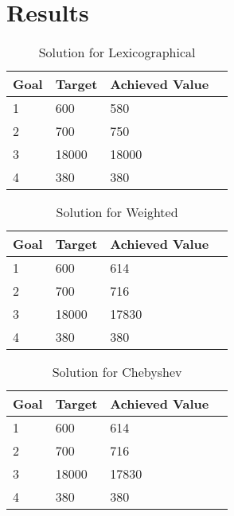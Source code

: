 \documentclass[twoside,twocolumn]{article}
\begin{document}

\section{Results}

\begin{table}[h]
\caption{Solution for Lexicographical}
\centering
\begin{tabular}{lllr}
Goal & Target & Achieved Value \\
\midrule
1    & 600    & 580            \\ 
2    & 700    & 750            \\ 
3    & 18000  & 18000          \\ 
4    & 380    & 380            \\ 
\bottomrule
\end{tabular}
\end{table}

\begin{table}[h]
\caption{Solution for Weighted}
\centering
\begin{tabular}{lllr}
Goal & Target & Achieved Value \\
\midrule
1    & 600    & 614 \\ 
2    & 700    & 716            \\ 
3    & 18000  & 17830 \\ 
4    & 380    & 380            \\ 
\bottomrule
\end{tabular}
\end{table}

\begin{table}[h]
\caption{Solution for Chebyshev}
\centering
\begin{tabular}{lllr}
Goal & Target & Achieved Value \\
\midrule
1    & 600    & 614            \\ 
2    & 700    & 716            \\ 
3    & 18000  & 17830 			\\ 
4    & 380    & 380            \\ 
\bottomrule
\end{tabular}
\end{table}
\end{document}
